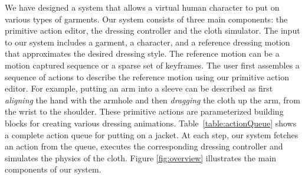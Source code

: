 We have designed a system that allows a virtual human character to put on
various types of garments. Our system consists of three main components:
the primitive action editor, the dressing controller and the cloth
simulator. The input to our system includes a garment, a character, and a
reference dressing motion that approximates the desired dressing style.
The reference motion can be a motion captured sequence or a sparse set of
keyframes. The user first assembles a sequence of actions to describe the
reference motion using our primitive action editor. For example, putting
an arm into a sleeve can be described as first \emph{aligning} the hand
with the armhole and then \emph{dragging} the cloth up the arm, from the
wrist to the shoulder. These primitive actions are parameterized
building blocks for creating various dressing animations.
Table~\ref{table:actionQueue} shows a complete action queue for putting on
a jacket. At each step, our system fetches an action from the
queue, executes the corresponding dressing controller and simulates the
physics of the cloth. Figure \ref{fig:overview} illustrates the main
components of our system. 


